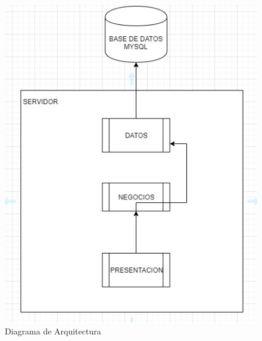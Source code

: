 \documentclass{article}
\begin{document}
\begin{figure}
    \centering
    \includegraphics{DiagramaArquitectura.png}
    \caption{Diagrama de Arquitectura}
    \label{fig:my_label}
\end{figure}
\end{document}
